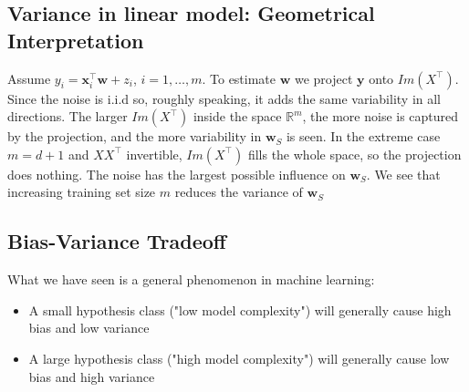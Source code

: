 \documentclass[11pt]{article}
\newcommand{\R}{\ensuremath{\mathbb{R}}}
\newcommand{\Tr}{\ensuremath{\top}}
\begin{document}
\subsection{Variance in linear model: Geometrical Interpretation}
Assume $y_i = \mathbf{x}_i^\Tr \mathbf{w}+z_i$, $i=1,\ldots,m$. To estimate $\mathbf{w}$ we project $\mathbf{y}$ onto $Im(X^\Tr)$.
Since the noise is i.i.d so, roughly speaking, it adds the same variability in all directions. 
The larger $Im(X^\Tr)$ inside the space $\R^m$, the more noise is  captured by the projection, and the more variability in $\mathbf{w}_S$ is seen.
 In the extreme case $m=d+1$ and $XX^\Tr$ invertible, $Im(X^\Tr)$ fills the whole space, so the projection does nothing. The noise has the largest possible influence on $\mathbf{w}_S$.
 We see that increasing training set size $m$ reduces the variance of $\mathbf{w}_S$

\newpage
\subsection{Bias-Variance Tradeoff}
What we have seen is a general phenomenon in machine learning:
      \begin{itemize}
               \item A small hypothesis class ("low model complexity") will generally  cause high bias and low variance
        \item A large hypothesis class ("high model complexity") will generally cause low bias and high variance
      \end{itemize}
\end{document}
